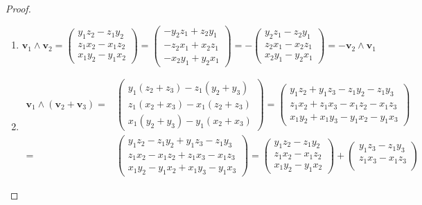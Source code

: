 \documentclass{article}
\theoremstyle{plain}
\theoremstyle{definition}
\theoremstyle{remark}
\begin{document}
\begin{proof}\hfill
\begin{enumerate}
    \item 
    \[ \mathbf{v}_1 \wedge \mathbf{v}_2 =
    \begin{pmatrix}
    y_1 z_2 - z_1 y_2\\
    z_1 x_2 - x_1 z_2\\
    x_1 y_2 - y_1 x_2    
    \end{pmatrix}=
    \begin{pmatrix}
    -y_2z_1 + z_2y_1 \\
    -z_2x_1 + x_2z_1 \\
    -x_2y_1 + y_2x_1     
    \end{pmatrix}=-
    \begin{pmatrix}
    y_2z_1 - z_2y_1 \\
    z_2x_1 - x_2z_1 \\
    x_2y_1 - y_2x_1     
    \end{pmatrix}=-\mathbf{v}_2 \wedge \mathbf{v}_1
    \]
    \item 
    \begin{align*}
        \mathbf{v}_1 \wedge (\mathbf{v}_2 + \mathbf{v}_3)=&
    \begin{pmatrix}
    y_1 (z_2+z_3) - z_1 (y_2+y_3)\\
    z_1 (x_2+x_3) - x_1 (z_2+z_3)\\
    x_1 (y_2+y_3) - y_1 (x_2+x_3)
    \end{pmatrix}=
    \begin{pmatrix}
     y_1z_2+y_1z_3 - z_1y_2-z_1y_3\\
     z_1x_2+z_1x_3 - x_1z_2-x_1z_3\\
     x_1y_2+x_1y_3 - y_1x_2-y_1x_3
    \end{pmatrix}\\
    =&\begin{pmatrix}
     y_1z_2- z_1y_2 + y_1z_3 -z_1y_3\\
     z_1x_2- x_1z_2 + z_1x_3 -x_1z_3\\
     x_1y_2- y_1x_2 + x_1y_3 -y_1x_3
    \end{pmatrix}=
    \begin{pmatrix}
     y_1z_2- z_1y_2 \\
     z_1x_2- x_1z_2 \\
     x_1y_2- y_1x_2 
    \end{pmatrix}+
    \begin{pmatrix}
    y_1z_3 -z_1y_3\\
    z_1x_3 -x_1z_3\\

\end{pmatrix}
\end{align*}
\end{enumerate}
\end{proof}
\end{document}

